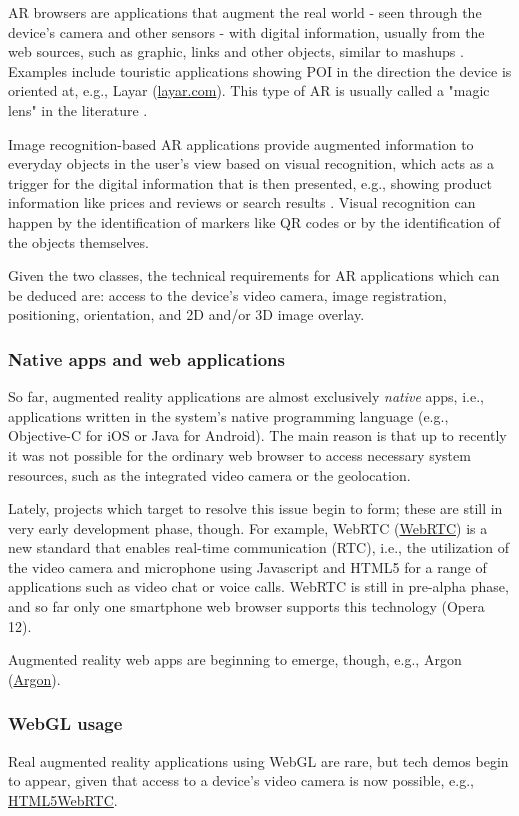 \documentclass[12pt,journal,compsoc]{IEEEtran}
\begin{document}
AR browsers are applications that augment the real world - seen through the device's camera and other sensors - with digital information, usually from the web sources, such as graphic, links and other objects, similar to mashups \cite{Schmalstieg2011}.  Examples include touristic applications showing POI in the direction the device is oriented at, e.g., Layar (\url{layar.com}). This type of AR is usually called a "magic lens" in the literature \cite{Olsson2011a}. 

Image recognition-based AR applications provide augmented information to everyday objects in the user's view based on visual recognition, which acts as a trigger for the digital information that is then presented, e.g., showing product information like prices and reviews \cite{ShopSavvy} or search results \cite{GoogleGoggles}. Visual recognition can happen by the identification of markers like QR codes or by the identification of the objects themselves.

Given the two classes, the technical requirements for AR applications which can be deduced are: access to the device’s video camera, image registration, positioning, orientation, and 2D and/or 3D image overlay.


\subsubsection{Native apps and web applications}
So far, augmented reality applications are almost exclusively \textit{native} apps, i.e., applications written in the system’s native programming language (e.g., Objective-C for iOS or Java for Android). The main reason is that up to recently it was not possible for the ordinary web browser to access necessary system resources, such as the integrated video camera or the geolocation.

\label{WebRTC} Lately, projects which target to resolve this issue begin to form; these are still in very early development phase, though. For example, WebRTC (\url{WebRTC}) is a new  standard that enables real-time communication (RTC), i.e., the utilization of the video camera and microphone using Javascript and HTML5 for a range of applications such as video chat or voice calls. WebRTC is still in pre-alpha phase, and so far only one smartphone web browser supports this technology (Opera 12).

Augmented reality web apps are beginning to emerge, though, e.g., Argon (\url{Argon}).

\subsubsection{WebGL usage}
Real augmented reality applications using WebGL are rare, but tech demos begin to appear, given that access to a device’s video camera is now possible, e.g., \url{ HTML5WebRTC}.
\end{document}
